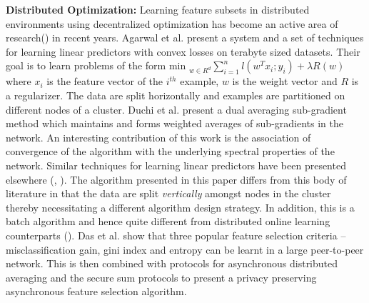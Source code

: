 \noindent \textbf{Distributed Optimization: } Learning feature subsets in distributed environments using decentralized optimization
has become an active area of research(\cite{Duchi_12,Agarwal_14a,Chris_08}) in recent years. 
Agarwal et al. \cite{Agarwal_14a} present a system and a set of techniques for
learning linear predictors with convex losses on terabyte sized datasets.
Their goal is to learn problems of the form
$ \text{min }_{w \in R^d} \sum_{i=1}^{n} l (w^T x_i; y_i) + \lambda R(w)$
where $x_i$ is the feature vector of the $i^{th}$ example, $w$ is the weight vector
and $R$ is a regularizer. The data are split horizontally and examples are
partitioned on different nodes of a cluster. Duchi et al.
\cite{Duchi_12} present a dual averaging sub-gradient method which
maintains and forms weighted averages of sub-gradients in the network. An
interesting contribution of this work is the association of convergence of the
algorithm with the underlying spectral properties of the network.
Similar techniques for learning linear predictors have been presented
elsewhere (\cite{Mangasarian_95,McDonald_10,zinkevich_10},
\cite{Hogwild_11,Boyd_11}). The algorithm presented in this paper
differs from this body of literature in that the data are split
\emph{vertically} amongst nodes in the cluster thereby necessitating a
different algorithm design strategy. In addition, this is a batch algorithm and
hence quite different from distributed online learning
counterparts (\cite{Dekel_12a,Langford_09a,bottou_2011}).
Das et al. \cite{Das_10}
show that three popular feature selection criteria -- misclassification gain,
gini index and entropy can be learnt in a large peer-to-peer network.
This is then combined with protocols for asynchronous distributed
averaging and the secure sum protocols to present a privacy preserving
asynchronous feature selection algorithm.



